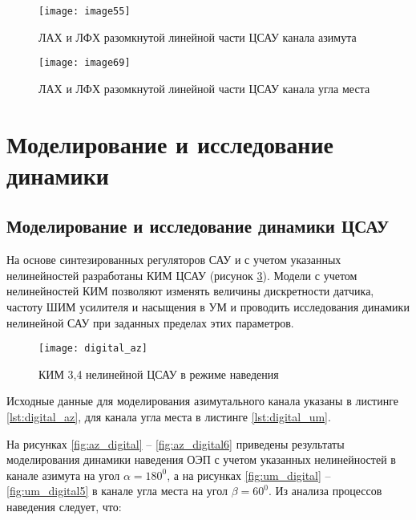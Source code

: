 \begin{figure}[!ht]
	\centering
	\texttt{[image: image55]} 
	\caption{ЛАХ и ЛФХ разомкнутой линейной части ЦСАУ канала азимута}
	\label{fig:DSAU}
\end{figure}

\begin{figure}[!ht]
	\centering
	\texttt{[image: image69]} 
	\caption{ЛАХ и ЛФХ разомкнутой линейной части ЦСАУ канала угла места}
	\label{fig:DSAU2}
\end{figure}

\section{Моделирование и исследование динамики} \label{subsec:ch4/modeling}

\subsection{Моделирование и исследование динамики ЦСАУ} \label{subsec:ch4/sect4/sub4}

На основе синтезированных регуляторов САУ и с учетом указанных нелинейностей разработаны КИМ ЦСАУ (рисунок \ref{fig:digital_az}). Модели с учетом нелинейностей КИМ позволяют изменять величины дискретности датчика, частоту ШИМ усилителя и насыщения в УМ и проводить исследования динамики нелинейной САУ при заданных пределах этих параметров. 


\begin{figure}
	\centering
	\texttt{[image: digital\_az]} 
	\caption{КИМ 3,4 нелинейной ЦСАУ в режиме наведения}
	\label{fig:digital_az}
\end{figure}

Исходные данные для моделирования азимутального канала указаны в листинге \ref{lst:digital_az}, для канала угла места в листинге \ref{lst:digital_um}. 

\begingroup
\captiondelim{ } %

\endgroup

\begingroup
\captiondelim{ } %

\endgroup

На рисунках \ref{fig:az_digital} – \ref{fig:az_digital6} приведены результаты моделирования динамики наведения ОЭП с учетом указанных нелинейностей в канале азимута на угол  $\alpha=180^0$, а на рисунках \ref{fig:um_digital} – \ref{fig:um_digital5} в канале угла места на угол  $\beta=60^0$. Из анализа процессов наведения следует, что:\par

